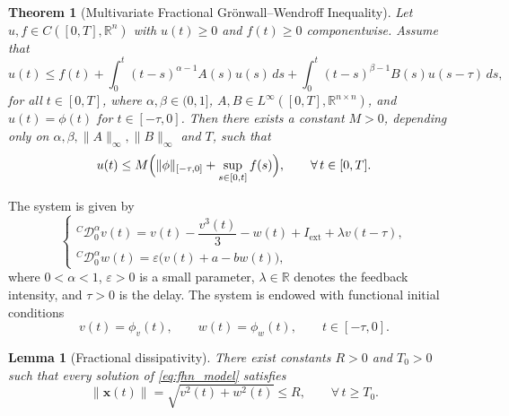 \documentclass[10pt,a4paper]{amsart}
\newtheorem{theorem}{Theorem}
\newtheorem{lemma}{Lemma}
\begin{document}
	\begin{theorem}[Multivariate Fractional Grönwall--Wendroff Inequality]
		\label{thm:main_ineq}
		Let $u,f \in C([0,T],\mathbb{R}^n)$ with $u(t)\ge 0$ and $f(t)\ge 0$ componentwise. Assume that
		\begin{equation}
			u(t) \le f(t) + \int_0^t (t-s)^{\alpha-1} A(s)u(s)\,ds + \int_0^t (t-s)^{\beta-1} B(s)u(s-\tau)\,ds,
			\label{eq:inequality_form}
		\end{equation}
		for all $t\in[0,T]$, where $\alpha,\beta\in(0,1]$, $A,B\in L^\infty([0,T],\mathbb{R}^{n\times n})$, and $u(t)=\phi(t)$ for $t\in[-\tau,0]$. Then there exists a constant $M>0$, depending only on $\alpha,\beta,\|A\|_\infty,\|B\|_\infty$ and $T$, such that
		\begin{equation}
			u(t) \le M\Bigl(\|\phi\|_{[-\tau,0]}+\sup_{s\in[0,t]}f(s)\Bigr), \qquad \forall\, t\in[0,T].
			\label{eq:inequality_result}
		\end{equation}
	\end{theorem}

	The system is given by
	\begin{equation}
		\begin{cases}
			^{C}\mathcal{D}_{0}^{\alpha} v(t) = v(t) - \dfrac{v^3(t)}{3} - w(t) + I_{\mathrm{ext}} + \lambda v(t-\tau), \\[0.3em]
			^{C}\mathcal{D}_{0}^{\alpha} w(t) = \varepsilon \bigl(v(t) + a - b w(t)\bigr),
		\end{cases}
		\label{eq:fhn_model}
	\end{equation}
	where $0<\alpha<1$, $\varepsilon>0$ is a small parameter, $\lambda\in\mathbb{R}$ denotes the feedback intensity, and $\tau>0$ is the delay. The system is endowed with functional initial conditions
	\begin{equation}
		v(t)=\phi_v(t), \qquad w(t)=\phi_w(t), \qquad t\in[-\tau,0].
		\label{eq:fhn_initial}
	\end{equation}

	\begin{lemma}[Fractional dissipativity]
		\label{lem:dissipativity}
		There exist constants $R>0$ and $T_0>0$ such that every solution of \eqref{eq:fhn_model} satisfies
		\begin{equation}
			\|\mathbf{x}(t)\| = \sqrt{v^2(t)+w^2(t)} \le R, \qquad \forall\, t\ge T_0.
			\label{eq:absorbing_ball}
		\end{equation}
	\end{lemma}
\end{document}
